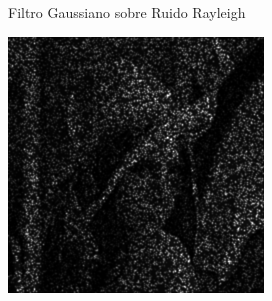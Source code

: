 \documentclass{beamer}
\begin{document}
\begin{frame}[fragile]{Filtro Gaussiano sobre Ruido Rayleigh}
\begin{minipage}{0.25\linewidth}
	\end{minipage}\hfill
	\begin{minipage}{0.25\linewidth}
		\centering
		\includegraphics[width=\linewidth]{../results/lena_rayleigh_xi10_gaussiano}
	\end{minipage}
\end{frame}
\end{document}
